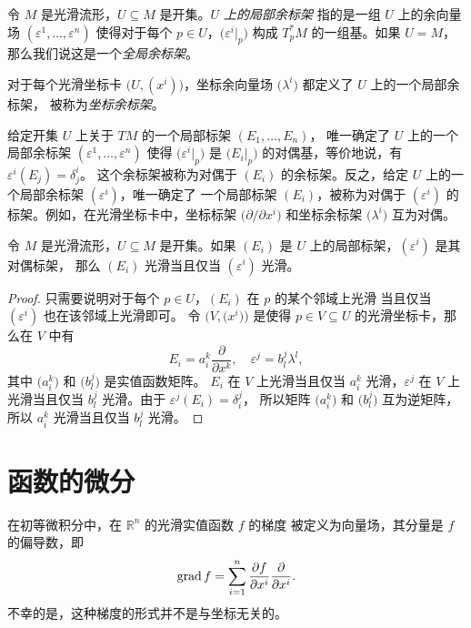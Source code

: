 令 $M$ 是光滑流形，$U\subseteq M$ 是开集。\emph{$U$ 上的局部余标架}
指的是一组 $U$ 上的余向量场 $(\varepsilon^1,\dots,\varepsilon^n)$
使得对于每个 $p\in U$，$\bigl(\varepsilon^i|_p\bigr)$ 构成
$T_p^*M$ 的一组基。如果 $U=M$，那么我们说这是一个\emph{全局余标架}。

\begin{example}[坐标余标架]
  对于每个光滑坐标卡 $\bigl(U,(x^i)\bigr)$，坐标余向量场
  $\bigl(\lambda^i\bigr)$ 都定义了 $U$ 上的一个局部余标架，
  被称为\emph{坐标余标架}。
\end{example}

给定开集 $U$ 上关于 $TM$ 的一个局部标架 $(E_1,\dots,E_n)$，
唯一确定了 $U$ 上的一个局部余标架 $(\varepsilon^1,\dots,\varepsilon^n)$
使得 $\bigl(\varepsilon^i|_p\bigr)$ 是 $\bigl(E_i|_p\bigr)$
的对偶基，等价地说，有 $\varepsilon^i(E_j)=\delta_j^i$。
这个余标架被称为对偶于 $(E_i)$ 的余标架。反之，给定
$U$ 上的一个局部余标架 $(\varepsilon^i)$，唯一确定了
一个局部标架 $(E_i)$，被称为对偶于 $(\varepsilon^i)$
的标架。例如，在光滑坐标卡中，坐标标架 $\bigl(\partial/\partial x^i\bigr)$
和坐标余标架 $\bigl(\lambda^i\bigr)$ 互为对偶。

\begin{lemma}
  令 $M$ 是光滑流形，$U\subseteq M$ 是开集。如果 $(E_i)$
  是 $U$ 上的局部标架，$(\varepsilon^i)$ 是其对偶标架，
  那么 $(E_i)$ 光滑当且仅当 $(\varepsilon^i)$ 光滑。
\end{lemma}
\begin{proof}
  只需要说明对于每个 $p\in U$，$(E_i)$ 在 $p$ 的某个邻域上光滑
  当且仅当 $(\varepsilon^i)$ 也在该邻域上光滑即可。
  令 $\bigl(V,\bigl(x^i\bigr)\bigr)$ 是使得 $p\in V\subseteq U$
  的光滑坐标卡，那么在 $V$ 中有
  \[
    E_i=a_i^k\frac{\partial}{\partial x^k},\quad
    \varepsilon^j=b_l^j\lambda^l,
  \]
  其中 $\bigl(a_i^k\bigr)$ 和 $\bigl(b_l^j\bigr)$ 是实值函数矩阵。
  $E_i$ 在 $V$ 上光滑当且仅当 $a_i^k$ 光滑，$\varepsilon^j$ 
  在 $V$ 上光滑当且仅当 $b_l^j$ 光滑。由于 $\varepsilon^j(E_i)=\delta_i^j$，
  所以矩阵 $\bigl(a_i^k\bigr)$ 和 $\bigl(b_l^j\bigr)$ 互为逆矩阵，
  所以 $a_i^k$ 光滑当且仅当 $b_l^j$ 光滑。
\end{proof}





\section{函数的微分}

在初等微积分中，在 $\mathbb{R}^n$ 的光滑实值函数 $f$ 的梯度
被定义为向量场，其分量是 $f$ 的偏导数，即
\begin{equation}
  \operatorname{grad} f= \sum_{i=1}^n\frac{\partial f}{\partial x^i}\frac{\partial}{\partial x^i}.
\end{equation}
不幸的是，这种梯度的形式并不是与坐标无关的。

